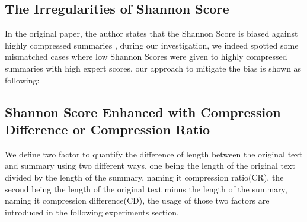 \subsection{The Irregularities of Shannon Score}
In the original paper, the author states that the Shannon Score is biased against highly compressed summaries \cite{shannonscore}, during our investigation, we indeed spotted some mismatched cases where low Shannon Scores were given to highly compressed summaries with high expert scores, our approach to mitigate the bias is shown as following:

\subsection{Shannon Score Enhanced with Compression Difference or Compression Ratio}
We define two factor to quantify the difference of length between the original text and summary using two different ways, one being the length of the original text divided by the length of the summary, naming it compression ratio(CR), the second being the length of the original text minus the length of the summary, naming it compression difference(CD), the usage of those two factors are introduced in the following experiments section.

